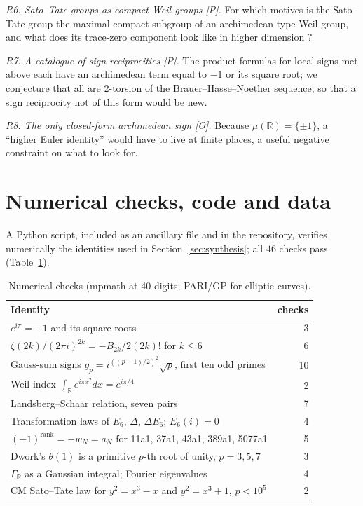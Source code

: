\documentclass[11pt]{amsart}
\numberwithin{equation}{section}
\newcommand{\R}{\mathbb{R}}
\begin{document}
\emph{R6. Sato--Tate groups as compact Weil groups [P].} For which motives is the Sato--Tate group the maximal compact subgroup of an archimedean-type Weil group, and what does its trace-zero component look like in higher dimension \cite{FKRS2012}?

\emph{R7. A catalogue of sign reciprocities [P].} The product formulas for local signs met above each have an archimedean term equal to $-1$ or its square root; we conjecture that all are $2$-torsion of the Brauer--Hasse--Noether sequence, so that a sign reciprocity not of this form would be new.

\emph{R8. The only closed-form archimedean sign [O].} Because $\mu(\R)=\{\pm1\}$, a ``higher Euler identity'' would have to live at finite places, a useful negative constraint on what to look for.

\section*{Numerical checks, code and data}
A Python script, included as an ancillary file and in the repository, verifies numerically the identities used in Section~\ref{sec:synthesis}; all $46$ checks pass (Table~\ref{tab:checks}).

\begin{table}[ht]
\centering\small
\caption{Numerical checks (mpmath at 40 digits; PARI/GP for elliptic curves).}\label{tab:checks}
\begin{tabular}{@{}lr@{}}
\toprule
Identity & checks\\
\midrule
$e^{i\pi}=-1$ and its square roots & 3\\
$\zeta(2k)/(2\pi i)^{2k}=-B_{2k}/2(2k)!$ for $k\le6$ & 6\\
Gauss-sum signs $g_p=i^{((p-1)/2)^2}\sqrt p$, first ten odd primes & 10\\
Weil index $\int_\R e^{i\pi x^2}dx=e^{i\pi/4}$ & 2\\
Landsberg--Schaar relation, seven pairs & 7\\
Transformation laws of $E_6$, $\Delta$, $\Delta E_6$; $E_6(i)=0$ & 4\\
$(-1)^{\mathrm{rank}}=-w_N=a_N$ for 11a1, 37a1, 43a1, 389a1, 5077a1 & 5\\
Dwork's $\theta(1)$ is a primitive $p$-th root of unity, $p=3,5,7$ & 3\\
$\Gamma_\R$ as a Gaussian integral; Fourier eigenvalues & 4\\
CM Sato--Tate law for $y^2=x^3-x$ and $y^2=x^3+1$, $p<10^5$ & 2\\
\bottomrule
\end{tabular}
\end{table}
\end{document}
